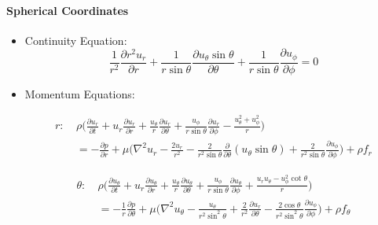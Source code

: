 \documentclass[a4paper]{article}
\begin{document}
    \paragraph{Spherical Coordinates}
        \begin{itemize}
            \item Continuity Equation:
            \[\frac{1}{r^{2}}\frac{\partial r^{2}u_{r}}{\partial r} + \frac{1}{r \sin \theta}\frac{\partial u_{\theta}\sin \theta}{\partial \theta} + \frac{1}{r \sin \theta}\frac{\partial u_{\phi}}{\partial \phi}=0\]
            
            \item Momentum Equations:
            
            \begin{equation*}
            \begin{split}
            r: \ & \rho \bigg(\frac{\partial u_{r}}{\partial t} + u_{r} \frac{\partial u_{r}}{\partial r} + \frac{u_{\theta}}{r}\frac{\partial u_{r}}{\partial \theta} + \frac{u_{\phi}}{r \sin \theta} \frac{\partial u_{r}}{\partial \phi} - \frac{u_{\theta}^{2}+u_{\phi}^{2}}{r} \bigg)  \\ 
            & = -\frac{\partial p}{\partial r} + \mu \bigg( \nabla^{2}u_{r} - \frac{2u_{r}}{r^{2}} - \frac{2}{r^{2}\sin \theta}\frac{\partial}{\partial \theta}(u_{\theta}\sin\theta) + \frac{2}{r^{2}\sin\theta}\frac{\partial u_{\phi}}{\partial \phi} \bigg) + \rho f_{r}
            \end{split}  
            \end{equation*}
            
            \begin{equation*}
            \begin{split}
            \theta: \ & \rho \bigg(\frac{\partial u_{\theta}}{\partial t} + u_{r} \frac{\partial u_{\theta}}{\partial r} + \frac{u_{\theta}}{r} \frac{\partial u_{\theta}}{\partial \theta} + \frac{u_{\phi}}{r\sin \theta} \frac{\partial u_{\theta}}{\partial \phi} + \frac{u_{r}u_{\theta}-u_{\phi}^{2}\cot\theta}{r} \bigg) \\
            & = -\frac{1}{r}\frac{\partial p}{\partial \theta} + \mu \bigg( \nabla^{2}u_{\theta} - \frac{u_{\theta}}{r^{2}\sin^{2}\theta} + \frac{2}{r^{2}}\frac{\partial u_{r}}{\partial \theta} - \frac{2\cos \theta}{r^{2}\sin^{2}\theta}\frac{\partial u_{\phi}}{\partial \phi} \bigg) + \rho f_{\theta}
            \end{split}  
            \end{equation*}
            

\end{itemize}
\end{document}

